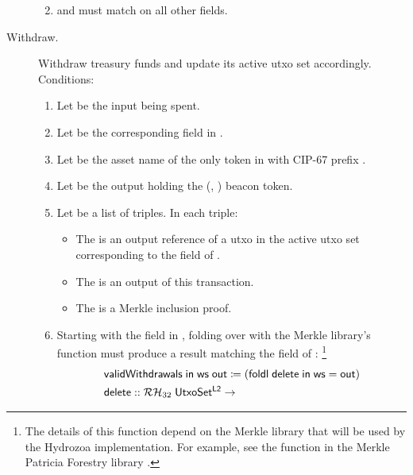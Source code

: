\documentclass[../hydrozoa.tex]{subfiles}
\begin{document}
\begin{description}
\begin{enumerate}
\begin{enumerate}
        \end{enumerate}
      \item {} and  must match on all other fields.
    \end{enumerate}
  \item[Withdraw.] Withdraw treasury funds and update its active utxo set accordingly.
    Conditions:
    \begin{enumerate}
      \item Let  be the input being spent.
      \item Let  be the corresponding field in .
      \item Let  be the asset name of the only  token in  with CIP-67 prefix \headBeaconToken{}.
      \item Let  be the output holding the (, ) beacon token.
      \item Let  be a list of triples. In each triple:
        \begin{itemize}
          \item The  is an output reference of a utxo in the active utxo set corresponding to the  field of .
          \item The  is an output of this transaction.
          \item The  is a Merkle inclusion proof.
        \end{itemize}
      \item Starting with the  field in , folding over  with the Merkle library's  function must produce a result matching the  field of :%
        \footnote{The details of this function depend on the Merkle library that will be used by the Hydrozoa implementation. For example, see the  function in the Merkle Patricia Forestry library \citep{MatthiasBenkortMerklePatriciaForestry2024}.}
        \begin{equation*}
        \begin{split}
          &\T{validWithdrawals} \; \T{in} \; \T{ws} \; \T{out} \coloneq
            (\T{foldl} \; \T{delete} \; \T{in} \; \T{ws} = \T{out}) \\
          &\T{delete} ::
            \mathcal{RH}_{32} \; \T{UtxoSet^{L2}} ->

\end{split}
\end{equation*}
\end{enumerate}
\end{description}
\end{document}
